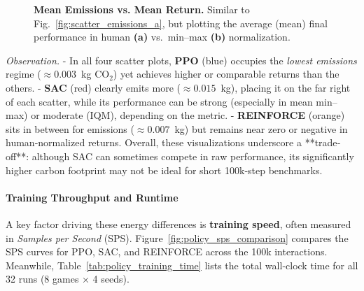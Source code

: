 \begin{figure}[htbp]
	\centering
	\quad
	\caption{\textbf{Mean Emissions vs. Mean Return.}
		Similar to Fig.~\ref{fig:scatter_emissions_a}, but plotting the average (mean) final performance in human \textbf{(a)} vs.\ min--max \textbf{(b)} normalization.}
	\label{fig:scatter_emissions_b}
\end{figure}

\noindent
\emph{Observation.} 
- In all four scatter plots, \textbf{PPO} (blue) occupies the \emph{lowest emissions} regime (\(\approx 0.003\)~kg CO$_2$) yet achieves higher or comparable returns than the others. 
- \textbf{SAC} (red) clearly emits more (\(\approx 0.015\)~kg), placing it on the far right of each scatter, while its performance can be strong (especially in mean min–max) or moderate (IQM), depending on the metric. 
- \textbf{REINFORCE} (orange) sits in between for emissions (\(\approx 0.007\)~kg) but remains near zero or negative in human‐normalized returns. 
Overall, these visualizations underscore a **trade‐off**: although SAC can sometimes compete in raw performance, its significantly higher carbon footprint may not be ideal for short 100k‐step benchmarks.

\paragraph{Training Throughput and Runtime}
A key factor driving these energy differences is \textbf{training speed}, often measured in \emph{Samples per Second} (SPS). Figure~\ref{fig:policy_sps_comparison} compares the SPS curves for PPO, SAC, and REINFORCE across the 100k interactions. Meanwhile, Table~\ref{tab:policy_training_time} lists the total wall‐clock time for all 32 runs (8 games × 4 seeds).

